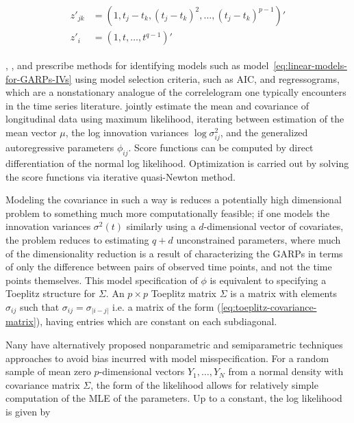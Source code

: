 \begin{align}
\begin{split}  \label{eq:GARP-IV-parametric-model}
z'_{jk} &= \left(1, t_j - t_k, \left(t_j - t_k\right)^2,\dots, \left(t_j - t_k\right)^{p-1}\right)' \\
z'_{i}  &= \left(1, t, \dots, t^{q-1}\right)'
\end{split}
\end{align}


\cite{pourahmadi1999joint}, \cite{pourahmadi2000maximum}, and \cite{pan2003modelling} prescribe methods for identifying models such as model~\ref{eq:linear-models-for-GARPs-IVs} using model selection criteria, such as AIC, and regressograms, which are a nonstationary analogue of the correlelogram one typically encounters in the time series literature. \cite{pan2003modelling} jointly estimate the mean and covariance of longitudinal data using maximum likelihood, iterating between estimation of the mean vector $\mu$, the log innovation variances $\log \sigma_{ij}^2$, and the generalized autoregressive parameters $\phi_{ij}$. Score functions can be computed by direct differentiation of the normal log likelihood. Optimization is carried out by solving the score functions via iterative quasi-Newton method. 

\bigskip

Modeling the covariance in such a way is reduces a potentially high dimensional problem to something much more computationally feasible; if one models the innovation variances $\sigma^2\left(t\right)$ similarly using a $d$-dimensional vector of covariates, the problem reduces to estimating $q+d$ unconstrained parameters, where much of the dimensionality reduction is a result of characterizing the GARPs in terms of only the difference between pairs of observed time points, and not the time points themselves.  This model specification of $\phi$ is equivalent to specifying a Toeplitz structure for $\Sigma$. An $p \times p$ Toeplitz matrix $\Sigma$ is a matrix with elements $\sigma_{ij}$ such that $\sigma_{ij} = \sigma_{\vert i-j \vert}$ i.e. a matrix of the form (\ref{eq:toeplitz-covariance-matrix}), having entries which are constant on each subdiagonal.

\bigskip

Nany have alternatively proposed nonparametric and semiparametric techniques approaches to avoid bias incurred with model misspecification. For a random sample of mean zero $p$-dimensional vectors $Y_1,\dots , Y_N$  from a normal density with covariance matrix $\Sigma$, the form of the likelihood allows for relatively simple computation of the MLE of the parameters. Up to a constant, the log likelihood is given by 

